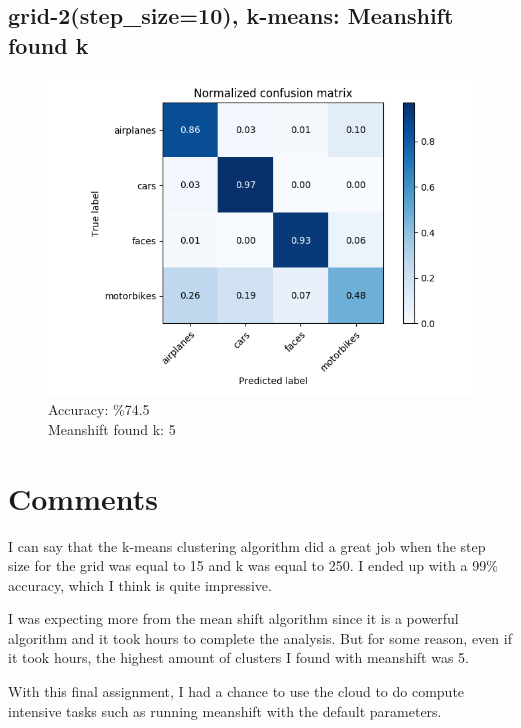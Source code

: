 \subsection*{grid-2(step\_size=10), k-means: Meanshift found k}
\begin{figure}[H]
    \centering
    \includegraphics[scale = 0.45]{images/confusion-stp-15-kmeanshift.png}
    \caption*{Accuracy: \%74.5 \\
              Meanshift found k: 5}
\end{figure}

\section*{Comments}

I can say that the k-means clustering algorithm did a great job when the step
size for the grid was equal to 15 and k was equal to 250. I ended up with a 99\%
accuracy, which I think is quite impressive.

I was expecting more from the mean shift algorithm since it is a powerful
algorithm and it took hours to complete the analysis. But for some reason, even
if it took hours, the highest amount of clusters I found with meanshift was 5. 

With this final assignment, I had a chance to use the cloud to do compute
intensive tasks such as running meanshift with the default parameters.

